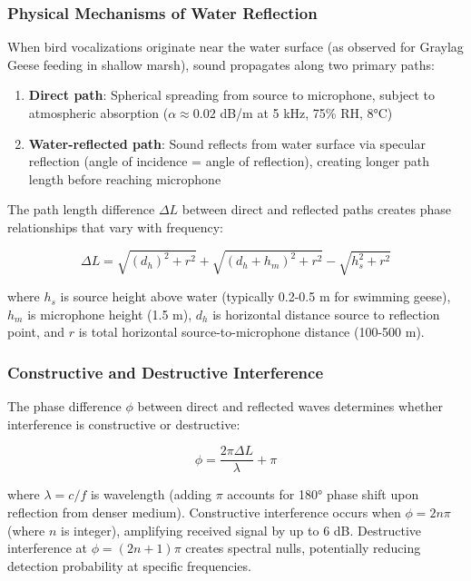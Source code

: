 \documentclass[twocolumn]{article}
\begin{document}
\subsubsection{Physical Mechanisms of Water Reflection}

When bird vocalizations originate near the water surface (as observed for Graylag Geese feeding in shallow marsh), sound propagates along two primary paths:

\begin{enumerate}
\item \textbf{Direct path}: Spherical spreading from source to microphone, subject to atmospheric absorption ($\alpha \approx 0.02$ dB/m at 5 kHz, 75\% RH, 8°C)

\item \textbf{Water-reflected path}: Sound reflects from water surface via specular reflection (angle of incidence = angle of reflection), creating longer path length before reaching microphone
\end{enumerate}

The path length difference $\Delta L$ between direct and reflected paths creates phase relationships that vary with frequency:

\begin{equation}
\Delta L = \sqrt{(d_h)^2 + r^2} + \sqrt{(d_h + h_m)^2 + r^2} - \sqrt{h_s^2 + r^2}
\end{equation}

where $h_s$ is source height above water (typically 0.2-0.5 m for swimming geese), $h_m$ is microphone height (1.5 m), $d_h$ is horizontal distance source to reflection point, and $r$ is total horizontal source-to-microphone distance (100-500 m).

\subsubsection{Constructive and Destructive Interference}

The phase difference $\phi$ between direct and reflected waves determines whether interference is constructive or destructive:

\begin{equation}
\phi = \frac{2\pi \Delta L}{\lambda} + \pi
\end{equation}

where $\lambda = c/f$ is wavelength (adding $\pi$ accounts for 180° phase shift upon reflection from denser medium). Constructive interference occurs when $\phi = 2n\pi$ (where $n$ is integer), amplifying received signal by up to 6 dB. Destructive interference at $\phi = (2n+1)\pi$ creates spectral nulls, potentially reducing detection probability at specific frequencies.
\end{document}

